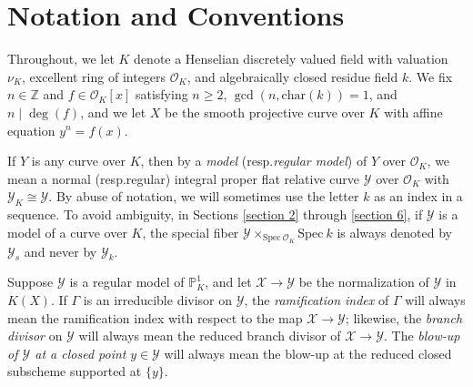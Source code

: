 \documentclass[12pt]{amsart}
\numberwithin{equation}{section}
\theoremstyle{definition}
\newcommand{\Z}{\mathbb Z}
\renewcommand{\O}{\mathcal{O}}
\renewcommand{\P}{\mathbb P}
\newcommand{\Spec}{\mathrm{Spec} \ }
\newcommand{\X}{\mathcal{X}}
\newcommand{\Y}{\mathcal{Y}}
\newcommand{\tx}[1]{\text{#1}}
\begin{document}

\section*{Notation and Conventions}
Throughout, we let $K$ denote a Henselian discretely valued field with valuation $\nu_K$, excellent ring of integers $\O_K$, and algebraically closed residue field $k$. %
We fix $n\in\Z$ and $f\in\O_K[x]$ satisfying $n\geq 2$, $\gcd(n,\tx{char}(k))=1$, and $n\mid \deg(f)$, and we let $X$ be the smooth projective curve over $K$ with affine equation $y^n=f(x)$.

If $Y$ is any curve over $K$, then by a \textit{model} (resp.\:\textit{regular model}) of $Y$ over $\O_K$, we mean a normal (resp.\:regular) integral proper flat relative curve $\Y$ over $\O_K$ with $\Y_K\cong\Y$. By abuse of notation, we will sometimes use the letter $k$ as an index in a sequence. To avoid ambiguity, in Sections \ref{section 2} through \ref{section 6}, if $\Y$ is a model of a curve over $K$, the special fiber $\Y\times_{\Spec\O_K}\Spec k$ is always denoted by $\Y_s$ and never by $\Y_k$.

Suppose $\Y$ is a regular model of $\P^1_{K}$, and let $\X\to\Y$ be the normalization of $\Y$ in $K(X)$. If $\Gamma$ is an irreducible divisor on $\Y$, the \textit{ramification index} of $\Gamma$ will always mean the ramification index with respect to the map $\X\to\Y$; likewise, the \textit{branch divisor} on $\Y$ will always mean the reduced branch divisor of $\X\to\Y$. The \textit{blow-up of $\Y$ at a closed point} $y\in\Y$ will always mean the blow-up at the reduced closed subscheme supported at $\{y\}$.
\end{document}
